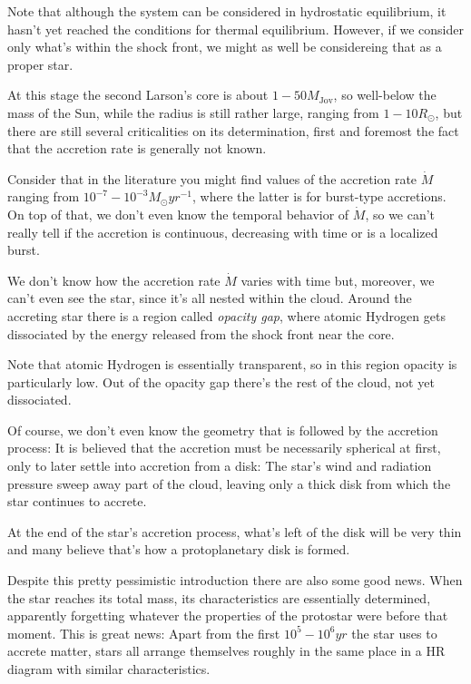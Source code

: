 \par Note that although the system can be considered in hydrostatic equilibrium, it hasn't yet reached the conditions for thermal equilibrium. However, if we consider only what's within the shock front, we might as well be considereing that as a proper star.
\par At this stage the second Larson's core is about $1-50M_{\text{Jov}}$, so well-below the mass of the Sun, while the radius is still rather large, ranging from $1-10R_{\odot}$, but there are still several criticalities on its determination, first and foremost the fact that the accretion rate is generally not known.
\par Consider that in the literature you might find values of the accretion rate $\dot{M}$ ranging from $10^{-7}-10^{-3}M_{\odot}\unit{yr}^{-1}$, where the latter is for burst-type accretions. On top of that, we don't even know the temporal behavior of $\dot{M}$, so we can't really tell if the accretion is continuous, decreasing with time or is a localized burst.
\par We don't know how the accretion rate $\dot{M}$ varies with time but, moreover, we can't even see the star, since it's all nested within the cloud. Around the accreting star there is a region called \emph{opacity gap}, where atomic Hydrogen gets dissociated by the energy released from the shock front near the core.
\par Note that atomic Hydrogen is essentially transparent, so in this region opacity is particularly low. Out of the opacity gap there's the rest of the cloud, not yet dissociated.
\par Of course, we don't even know the geometry that is followed by the accretion process: It is believed that the accretion must be necessarily spherical at first, only to later settle into accretion from a disk: The star's wind and radiation pressure sweep away part of the cloud, leaving only a thick disk from which the star continues to accrete.
\par At the end of the star's accretion process, what's left of the disk will be very thin and many believe that's how a protoplanetary disk is formed.
\par Despite this pretty pessimistic introduction there are also some good news. When the star reaches its total mass, its characteristics are essentially determined, apparently forgetting whatever the properties of the protostar were before that moment. This is great news: Apart from the first $10^{5}-10^{6}\unit{yr}$ the star uses to accrete matter, stars all arrange themselves roughly in the same place in a HR diagram with similar characteristics.
